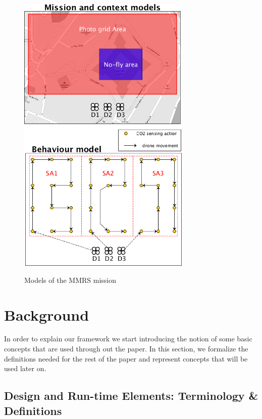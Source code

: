 \documentclass[journal]{IEEEtran}
\theoremstyle{definition}
\begin{document}
\begin{figure}[h]

\includegraphics[width=3.25in]{Figures/overall-mini2.png}
\label{fig:second}
\caption{Models of the MMRS mission}
\end{figure}


\section{Background}





In order to explain our framework we
start introducing the notion of some basic concepts that are used through out the paper.
In this section, we formalize the definitions needed for the rest of
the paper and represent concepts that will be used later on.

\subsection{Design and Run-time Elements: Terminology \& Definitions}
\end{document}
